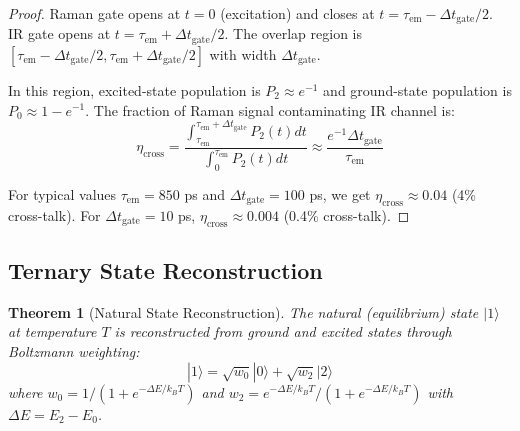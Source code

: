 \documentclass[twocolumn,10pt]{article}
\newtheorem{theorem}{Theorem}[section]
\begin{document}
\begin{proof}
Raman gate opens at $t=0$ (excitation) and closes at $t = \tau_{\text{em}} - \Delta t_{\text{gate}}/2$. IR gate opens at $t = \tau_{\text{em}} + \Delta t_{\text{gate}}/2$. The overlap region is $[\tau_{\text{em}} - \Delta t_{\text{gate}}/2, \tau_{\text{em}} + \Delta t_{\text{gate}}/2]$ with width $\Delta t_{\text{gate}}$.

In this region, excited-state population is $P_2 \approx e^{-1}$ and ground-state population is $P_0 \approx 1 - e^{-1}$. The fraction of Raman signal contaminating IR channel is:
\begin{equation}
\eta_{\text{cross}} = \frac{\int_{\tau_{\text{em}}}^{\tau_{\text{em}} + \Delta t_{\text{gate}}} P_2(t) dt}{\int_0^{\tau_{\text{em}}} P_2(t) dt} \approx \frac{e^{-1} \Delta t_{\text{gate}}}{\tau_{\text{em}}}
\end{equation}

For typical values $\tau_{\text{em}} = 850$ ps and $\Delta t_{\text{gate}} = 100$ ps, we get $\eta_{\text{cross}} \approx 0.04$ (4\% cross-talk). For $\Delta t_{\text{gate}} = 10$ ps, $\eta_{\text{cross}} \approx 0.004$ (0.4\% cross-talk).
\end{proof}

\subsection{Ternary State Reconstruction}

\begin{theorem}[Natural State Reconstruction]
\label{thm:natural_reconstruction}
The natural (equilibrium) state $|1\rangle$ at temperature $T$ is reconstructed from ground and excited states through Boltzmann weighting:
\begin{equation}
|1\rangle = \sqrt{w_0} |0\rangle + \sqrt{w_2} |2\rangle
\end{equation}
where $w_0 = 1/(1 + e^{-\Delta E/k_BT})$ and $w_2 = e^{-\Delta E/k_BT}/(1 + e^{-\Delta E/k_BT})$ with $\Delta E = E_2 - E_0$.
\end{theorem}
\end{document}
